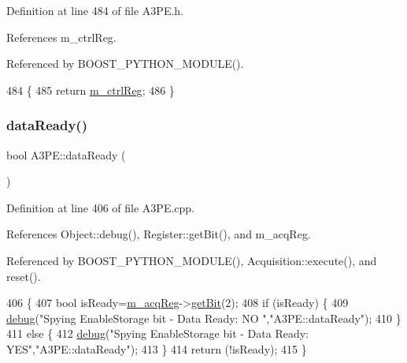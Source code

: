 Definition at line 484 of file A3\+P\+E.\+h.



References m\+\_\+ctrl\+Reg.



Referenced by B\+O\+O\+S\+T\+\_\+\+P\+Y\+T\+H\+O\+N\+\_\+\+M\+O\+D\+U\+L\+E().


\begin{DoxyCode}
484                      \{
485     \textcolor{keywordflow}{return} \hyperlink{classA3PE_a264834484dd6326ebad58c2a3e1be9a6}{m\_ctrlReg};
486   \}
\end{DoxyCode}
\mbox{\label{classA3PE_a55df064c578bbc1e80a3b5fc05933f27}} 
\subsubsection{\texorpdfstring{data\+Ready()}{dataReady()}}
{\footnotesize\ttfamily bool A3\+P\+E\+::data\+Ready (\begin{DoxyParamCaption}{ }\end{DoxyParamCaption})}



Definition at line 406 of file A3\+P\+E.\+cpp.



References Object\+::debug(), Register\+::get\+Bit(), and m\+\_\+acq\+Reg.



Referenced by B\+O\+O\+S\+T\+\_\+\+P\+Y\+T\+H\+O\+N\+\_\+\+M\+O\+D\+U\+L\+E(), Acquisition\+::execute(), and reset().


\begin{DoxyCode}
406                     \{
407   \textcolor{keywordtype}{bool} isReady=\hyperlink{classA3PE_abaf426f4c9192537117b77f9f4821e04}{m\_acqReg}->\hyperlink{classRegister_a5d27c9ff548817eee097ba4fdc8e8f69}{getBit}(2);
408   \textcolor{keywordflow}{if} (isReady) \{
409     \hyperlink{classObject_aac010553f022165573714b7014a15f0d}{debug}(\textcolor{stringliteral}{"Spying EnableStorage bit - Data Ready: NO "},\textcolor{stringliteral}{"A3PE::dataReady"});
410   \}
411   \textcolor{keywordflow}{else} \{
412     \hyperlink{classObject_aac010553f022165573714b7014a15f0d}{debug}(\textcolor{stringliteral}{"Spying EnableStorage bit - Data Ready: YES"},\textcolor{stringliteral}{"A3PE::dataReady"});
413   \}
414   \textcolor{keywordflow}{return} (!isReady);
415 \}
\end{DoxyCode}
\mbox{\label{classObject_aac010553f022165573714b7014a15f0d}} 
